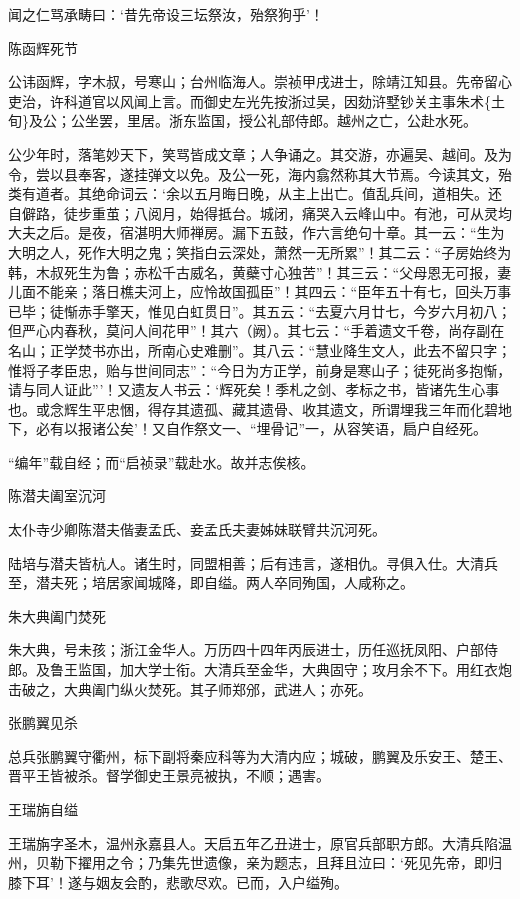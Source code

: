 \documentclass[]{article}
\begin{document}
闻之仁骂承畴曰：`昔先帝设三坛祭汝，殆祭狗乎'！

陈函辉死节

公讳函辉，字木叔，号寒山；台州临海人。崇祯甲戌进士，除靖江知县。先帝留心吏治，许科道官以风闻上言。而御史左光先按浙过吴，因劾浒墅钞关主事朱术\{土旬\}及公；公坐罢，里居。浙东监国，授公礼部侍郎。越州之亡，公赴水死。

公少年时，落笔妙天下，笑骂皆成文章；人争诵之。其交游，亦遍吴、越间。及为令，尝以县奉客，遂挂弹文以免。及公一死，海内翕然称其大节焉。今读其文，殆类有道者。其绝命词云：`余以五月晦日晚，从主上出亡。值乱兵间，道相失。还自僻路，徒步重茧；八阅月，始得抵台。城闭，痛哭入云峰山中。有池，可从灵均大夫之后。是夜，宿湛明大师禅房。漏下五鼓，作六言绝句十章。其一云：``生为大明之人，死作大明之鬼；笑指白云深处，萧然一无所累''！其二云：``子房始终为韩，木叔死生为鲁；赤松千古威名，黄蘗寸心独苦''！其三云：``父母恩无可报，妻儿面不能亲；落日樵夫河上，应怜故国孤臣''！其四云：``臣年五十有七，回头万事已毕；徒惭赤手擎天，惟见白虹贯日''。其五云：``去夏六月廿七，今岁六月初八；但严心内春秋，莫问人间花甲''！其六（阙）。其七云：``手着遗文千卷，尚存副在名山；正学焚书亦出，所南心史难删''。其八云：``慧业降生文人，此去不留只字；惟将子孝臣忠，贻与世间同志''：``今日为方正学，前身是寒山子；徒死尚多抱惭，请与同人证此'''！又遗友人书云：`辉死矣！季札之剑、孝标之书，皆诸先生心事也。或念辉生平忠悃，得存其遗孤、藏其遗骨、收其遗文，所谓埋我三年而化碧地下，必有以报诸公矣'！又自作祭文一、``埋骨记''一，从容笑语，扃户自经死。

``编年''载自经；而``启祯录''载赴水。故并志俟核。

陈潜夫阖室沉河

太仆寺少卿陈潜夫偕妻孟氏、妾孟氏夫妻姊妹联臂共沉河死。

陆培与潜夫皆杭人。诸生时，同盟相善；后有违言，遂相仇。寻俱入仕。大清兵至，潜夫死；培居家闻城降，即自缢。两人卒同殉国，人咸称之。

朱大典阖门焚死

朱大典，号未孩；浙江金华人。万历四十四年丙辰进士，历任巡抚凤阳、户部侍郎。及鲁王监国，加大学士衔。大清兵至金华，大典固守；攻月余不下。用红衣炮击破之，大典阖门纵火焚死。其子师郑邠，武进人；亦死。

张鹏翼见杀

总兵张鹏翼守衢州，标下副将秦应科等为大清内应；城破，鹏翼及乐安王、楚王、晋平王皆被杀。督学御史王景亮被执，不顺；遇害。

王瑞旃自缢

王瑞旃字圣木，温州永嘉县人。天启五年乙丑进士，原官兵部职方郎。大清兵陷温州，贝勒下擢用之令；乃集先世遗像，亲为题志，且拜且泣曰：`死见先帝，即归膝下耳'！遂与姻友会酌，悲歌尽欢。已而，入户缢殉。
\end{document}
